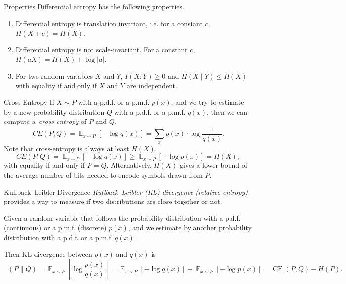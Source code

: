 \documentclass[
aspectratio=169]{beamer}
\DeclareMathOperator*{\E}{\mathbb{E}}
\DeclareMathOperator{\KL}{D_{KL}}
\DeclareMathOperator{\CE}{CE}
\begin{document}
\begin{frame}{Properties}
    Differential entropy has the following properties.
    \begin{enumerate}
        \item
        Differential entropy is translation invariant, i.e. for a constant $c$, $H(X+c)=H(X)$.


        \item     Differential entropy is not scale-invariant. For a constant $a$,
        $H(aX)=H(X)+\log|a|$.


        \item For two random variables $X$ and $Y$, $I(X:Y) \ge 0$ and $H(X\mid Y)\leq H(X)$ with equality if and only if $X$ and $Y$ are independent.
    \end{enumerate}
\end{frame}

\begin{frame}{Cross-Entropy}
If $X\sim P$ with a p.d.f. or a p.m.f. $p(x)$, and we try to estimate by a new probability distribution $Q$ with a p.d.f. or a p.m.f. $q(x)$, then we can compute a~\emph{cross-entropy} of $P$ and $Q$.
\[
CE(P,Q) = \E_{x \sim P} [- \log q(x)] = \sum_{x} p(x)\cdot \log\frac{1}{q(x)}.
\]
Note that cross-entropy is always at least $H(X)$.
\[
CE(P, Q) = \E_{x \sim P} [- \log q(x)] \geq \E_{x \sim P} [- \log p(x)] = H(X),
\]
with equality if and only if $P = Q$.
Alternatively, $H(X)$ gives a lower bound of the average number of bits needed to encode symbols drawn from $P$.
\end{frame}

\begin{frame}{Kullback–Leibler Divergence}
\emph{Kullback–Leibler (KL) divergence (relative entropy)} provides a way to measure if two distributions are close together or not.\medskip


Given a random variable that follows the probability distribution with a p.d.f. (continuous) or a p.m.f. (discrete) $p(x)$, and we estimate by another probability distribution with a p.d.f. or a p.m.f. $q(x)$. \medskip


Then KL divergence between $p(x)$ and $q(x)$ is
\[
\KL(P\parallel Q) = \E_{x \sim P} \left[ \log \frac{p(x)}{q(x)} \right] =
\E_{x \sim P} [- \log q(x)] -  \E_{x \sim P} [- \log p(x)] = \CE(P,Q) - H(P).
\]
\end{frame}
\end{document}
